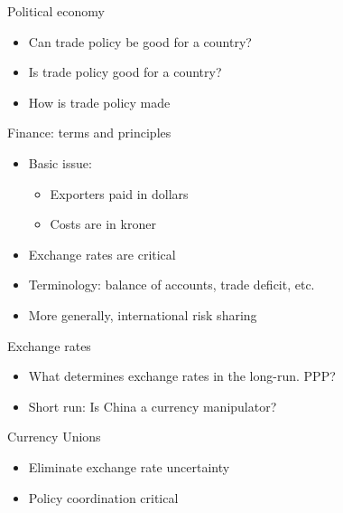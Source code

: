 \documentclass[ignorenonframetext,]{beamer}
\begin{document}
\begin{frame}{Political economy}

    \begin{itemize}
        \item Can trade policy be good for a country?
        \item Is trade policy good for a country?
        \item How is trade policy made
    \end{itemize}

\end{frame}

\begin{frame}{Finance: terms and principles}

    \begin{itemize}
        \item Basic issue:
        \begin{itemize}
            \item Exporters paid in dollars
            \item Costs are in kroner
        \end{itemize}
        \item Exchange rates are critical
        \item Terminology: balance of accounts, trade deficit, etc. 
        \item More generally, international risk sharing
    \end{itemize}

\end{frame}

\begin{frame}{Exchange rates}

    \begin{itemize}
        \item What determines exchange rates in the long-run.  PPP?
        \item Short run: Is China a currency manipulator?
    \end{itemize}

\end{frame}

\begin{frame}{Currency Unions}

    \begin{itemize}
        \item Eliminate exchange rate uncertainty
        \item Policy coordination critical
    \end{itemize}

\end{frame}
\end{document}
